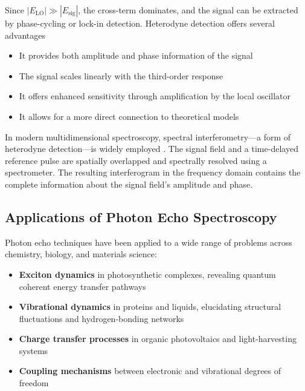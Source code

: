 \noindent Since $|E_{\text{LO}}| \gg |E_{\text{sig}}|$, the cross-term dominates, and the signal can be extracted by phase-cycling or lock-in detection. Heterodyne detection offers several advantages %

\begin{itemize}
	\item It provides both amplitude and phase information of the signal
	\item The signal scales linearly with the third-order response
	\item It offers enhanced sensitivity through amplification by the local oscillator
	\item It allows for a more direct connection to theoretical models
\end{itemize}

\noindent In modern multidimensional spectroscopy, spectral interferometry—a form of heterodyne detection—is widely employed \cite{hybletal1998twodimensionalelectronicspectroscopy}. The signal field and a time-delayed reference pulse are spatially overlapped and spectrally resolved using a spectrometer. The resulting interferogram in the frequency domain contains the complete information about the signal field's amplitude and phase.

\subsection{Applications of Photon Echo Spectroscopy}
\label{subsec:echo_applications}

\noindent Photon echo techniques have been applied to a wide range of problems across chemistry, biology, and materials science:

\begin{itemize}
	\item \textbf{Exciton dynamics} in photosynthetic complexes, revealing quantum coherent energy transfer pathways %
	\item \textbf{Vibrational dynamics} in proteins and liquids, elucidating structural fluctuations and hydrogen-bonding networks \cite{hammzanni2011conceptsmethods2d}
	\item \textbf{Charge transfer processes} in organic photovoltaics and light-harvesting systems
	\item \textbf{Coupling mechanisms} between electronic and vibrational degrees of freedom \cite{khaliletal2004vibrationalcoherencetransfer}
\end{itemize}

